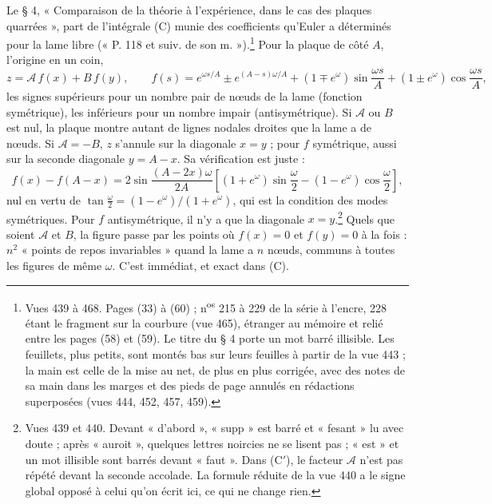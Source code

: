 \documentclass[11pt,a4paper]{article}
\begin{document}
Le § 4, « Comparaison de la théorie à l'expérience, dans le cas des plaques
quarrées », part de l'intégrale (C) munie des coefficients qu'Euler a déterminés pour
la lame libre (« P. 118 et suiv. de son m. »).\footnote{Vues 439 à 468. Pages (33) à
(60) ; n\textsuperscript{os} 215 à 229 de la série à l'encre, 228 étant le fragment
sur la courbure (vue 465), étranger au mémoire et relié entre les pages (58) et (59).
Le titre du § 4 porte un mot barré illisible. Les feuillets, plus petits, sont montés
bas sur leurs feuilles à partir de la vue 443 ; la main est celle de la mise au net,
de plus en plus corrigée, avec des notes de sa main dans les marges et des pieds de
page annulés en rédactions superposées (vues 444, 452, 457, 459).} Pour la plaque de
côté $A$, l'origine en un coin,
\[
z = \mathcal{A}\,f(x) + B\,f(y), \qquad
f(s) = e^{\omega s/A} \pm e^{(A-s)\omega/A} + (1 \mp e^{\omega})\sin\frac{\omega s}{A} + (1 \pm e^{\omega})\cos\frac{\omega s}{A},
\]
les signes supérieurs pour un nombre pair de nœuds de la lame (fonction symétrique),
les inférieurs pour un nombre impair (antisymétrique). Si $\mathcal{A}$ ou $B$ est nul,
la plaque montre autant de lignes nodales droites que la lame a de nœuds. Si
$\mathcal{A} = -B$, $z$ s'annule sur la diagonale $x = y$ ; pour $f$ symétrique, aussi
sur la seconde diagonale $y = A - x$. Sa vérification est juste :
\[
f(x) - f(A-x) = 2\sin\frac{(A-2x)\omega}{2A}\left[(1+e^{\omega})\sin\frac{\omega}{2} - (1-e^{\omega})\cos\frac{\omega}{2}\right],
\]
nul en vertu de $\tan\frac{\omega}{2} = (1-e^{\omega})/(1+e^{\omega})$, qui est la
condition des modes symétriques. Pour $f$ antisymétrique, il n'y a que la diagonale
$x = y$.\footnote{Vues 439 et 440. Devant « d'abord », « supp » est barré et « fesant »
lu avec doute ; après « auroit », quelques lettres noircies ne se lisent pas ; « est »
et un mot illisible sont barrés devant « faut ». Dans (C$'$), le facteur $\mathcal{A}$
n'est pas répété devant la seconde accolade. La formule réduite de la vue 440 a le
signe global opposé à celui qu'on écrit ici, ce qui ne change rien.} Quels que soient
$\mathcal{A}$ et $B$, la figure passe par les points où $f(x) = 0$ et $f(y) = 0$ à la
fois : $n^2$ « points de repos invariables » quand la lame a $n$ nœuds, communs à
toutes les figures de même $\omega$. C'est immédiat, et exact dans (C).
\end{document}
